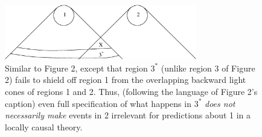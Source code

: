 \documentclass[12pt]{article}
\begin{document}
\begin{figure}[t]
\begin{center}
\includegraphics[width=3.3in,clip]{./fig3.eps}
\end{center}
\caption{
\label{fig3}
Similar to Figure 2, except that region $3^*$ (unlike region 3 of
Figure 2) fails to shield off region 1 from the overlapping backward
light cones of regions 1 and 2.  Thus, (following the language of
Figure 2's caption) even full specification of  what happens in $3^*$ 
\emph{does not necessarily make} events in 2 irrelevant for 
predictions about 1 in a locally causal theory.  
}
\end{figure}
\end{document}
